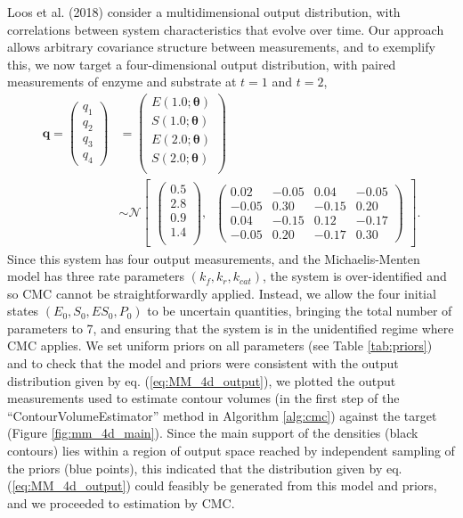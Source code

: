 Loos et al. (2018) consider a multidimensional output distribution, with correlations between system characteristics that evolve over time. Our approach allows arbitrary covariance structure between measurements, and to exemplify this, we now target a four-dimensional output distribution, with paired measurements of enzyme and substrate at $t=1$ and $t=2$,
%
\begin{equation}\label{eq:MM_4d_output}
\begin{aligned}
\boldsymbol{q} = \begin{pmatrix} q_1 \\ q_2 \\ q_3 \\ q_4 \end{pmatrix} &=
\begin{pmatrix}
E(1.0; \boldsymbol{\theta})\\
S(1.0; \boldsymbol{\theta})\\
E(2.0; \boldsymbol{\theta})\\
S(2.0; \boldsymbol{\theta})\\
\end{pmatrix}
\\
&\sim  \mathcal{N}
\begin{bmatrix}
\begin{pmatrix}
0.5\\
2.8\\
0.9\\
1.4\\
\end{pmatrix}, \;\;
\begin{pmatrix}
0.02 &  -0.05 &  0.04 & -0.05\\
-0.05 & 0.30  & -0.15 & 0.20\\
0.04 & -0.15  & 0.12  &  -0.17\\
-0.05 & 0.20 & -0.17 & 0.30
\end{pmatrix}
\end{bmatrix}.
\end{aligned}
\end{equation}
%
Since this system has four output measurements, and the Michaelis-Menten model has three rate parameters $(k_f,k_r,k_{cat})$, the system is over-identified and so CMC cannot be straightforwardly applied. Instead, we allow the four initial states $(E_0, S_0, ES_0, P_0)$ to be uncertain quantities, bringing the total number of parameters to 7, and ensuring that the system is in the unidentified regime where CMC applies. We set uniform priors on all parameters (see Table \ref{tab:priors}) and to check that the model and priors were consistent with the output distribution given by eq. (\ref{eq:MM_4d_output}), we plotted the output measurements used to estimate contour volumes (in the first step of the ``ContourVolumeEstimator'' method in Algorithm \ref{alg:cmc}) against the target (Figure \ref{fig:mm_4d_main}). Since the main support of the densities (black contours) lies within a region of output space reached by independent sampling of the priors (blue points), this indicated that the distribution given by eq. (\ref{eq:MM_4d_output}) could feasibly be generated from this model and priors, and we proceeded to estimation by CMC.

